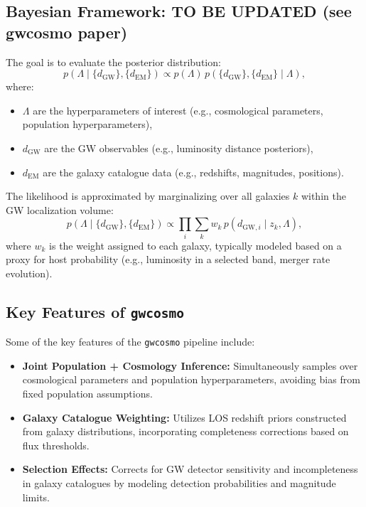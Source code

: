 \subsection{Bayesian Framework: \textbf{TO BE UPDATED} (see gwcosmo paper)}
The goal is to evaluate the posterior distribution:
\begin{equation}
p(\Lambda \mid \{d_{\text{GW}}\}, \{d_{\text{EM}}\}) \propto p(\Lambda) \, p(\{d_{\text{GW}}\}, \{d_{\text{EM}}\} \mid \Lambda),
\end{equation}
where:
\begin{itemize}
  \vspace{-1em}
  \item $\Lambda$ are the hyperparameters of interest (e.g., cosmological parameters, population hyperparameters),
  \vspace{-1em}
  \item $d_{\text{GW}}$ are the GW observables (e.g., luminosity distance posteriors),
  \vspace{-1em}
  \item $d_{\text{EM}}$ are the galaxy catalogue data (e.g., redshifts, magnitudes, positions).
\end{itemize}

The likelihood is approximated by marginalizing over all galaxies $k$ within the GW localization volume:
\begin{equation}
p(\Lambda \mid \{d_{\text{GW}}\}, \{d_{\text{EM}}\}) \propto \prod_{i} \sum_{k} w_k \, p(d_{\text{GW},i} \mid z_k, \Lambda),
\end{equation}
where $w_k$ is the weight assigned to each galaxy, typically modeled based on a proxy for host probability (e.g., luminosity in a selected band, merger rate evolution).

\subsection{Key Features of \texttt{gwcosmo}}
Some of the key features of the \texttt{gwcosmo} pipeline include:
\begin{itemize}
  \item \textbf{Joint Population + Cosmology Inference:} Simultaneously samples over cosmological parameters and population hyperparameters, avoiding bias from fixed population assumptions.
  \item \textbf{Galaxy Catalogue Weighting:} Utilizes \ac{LOS} redshift priors constructed from galaxy distributions, incorporating completeness corrections based on flux thresholds.
  \item \textbf{Selection Effects:} Corrects for GW detector sensitivity and incompleteness in galaxy catalogues by modeling detection probabilities and magnitude limits.
\end{itemize}

